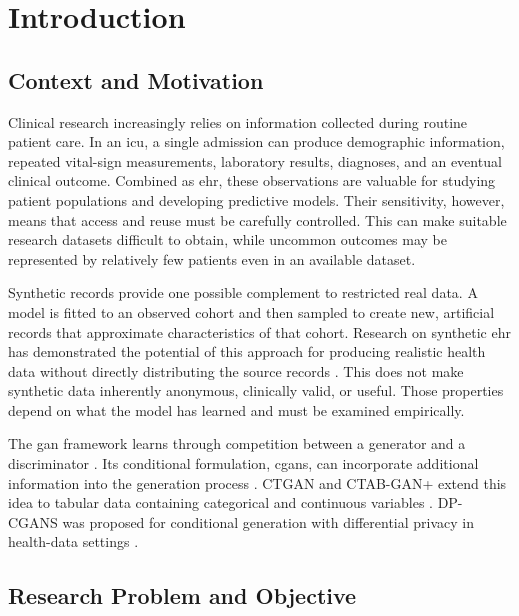 \chapter{Introduction}
\label{chap:introduction}

\section{Context and Motivation}

Clinical research increasingly relies on information collected during routine
patient care. In an \gls{icu}, a single admission can produce demographic
information, repeated vital-sign measurements, laboratory results, diagnoses,
and an eventual clinical outcome. Combined as \gls{ehr}, these observations
are valuable for studying patient populations and developing predictive
models. Their sensitivity, however, means that access and reuse must be
carefully controlled. This can make suitable research datasets difficult to
obtain, while uncommon outcomes may be represented by relatively few patients
even in an available dataset.

Synthetic records provide one possible complement to restricted real data. A
model is fitted to an observed cohort and then sampled to create new,
artificial records that approximate characteristics of that cohort. Research
on synthetic \gls{ehr} has demonstrated the potential of this approach for
producing realistic health data without directly distributing the source
records \cite{Yoon2023_EHRSafe}. This does not make synthetic data inherently
anonymous, clinically valid, or useful. Those properties depend on what the
model has learned and must be examined empirically.

The \gls{gan} framework learns through competition between a generator and a
discriminator \cite{Goodfellow2014GAN}. Its conditional formulation,
\glspl{cgan}, can incorporate additional information into the generation
process \cite{Mirza2014CGAN}. CTGAN and CTAB-GAN+ extend this idea to tabular
data containing categorical and continuous variables
\cite{Xu2019CTGAN,Zhao2024CTABGANPlus}. DP-CGANS was proposed for conditional
generation with differential privacy in health-data settings
\cite{Sun2023DPCGANS}.

\section{Research Problem and Objective}

